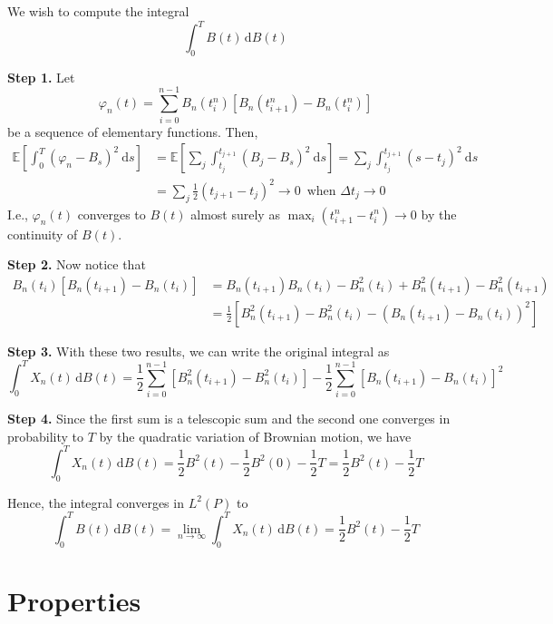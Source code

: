 \begin{example}
	We wish to compute the integral
	\[
		\int_0^T B(t) \, \mathrm{d}B(t)
	\]
	
	\textbf{Step 1.} Let
	\[
		\varphi_n(t) = \sum_{i=0}^{n-1} B_n(t_i^n)[B_n(t_{i+1}^n) - B_n(t_i^n)]
	\]
	be a sequence of elementary functions. Then,
	\begin{equation*}
		\begin{aligned}
			\mathbb{E} \left[ \int_0^T (\varphi_n - B_s)^2 ~\mathrm{d}s \right]
			&= \mathbb{E} \left[ \sum_j \int_{t_j}^{t_{j+1}} (B_j - B_s)^2 ~\mathrm{d}s \right]
			= \sum_j \int_{t_j}^{t_{j+1}} (s - t_j)^2 ~\mathrm{d}s \\
			&= \sum_j \frac{1}{2} \left(t_{j+1} - t_j \right)^2 \longrightarrow 0 \, \text{ when } \Delta t_j \to 0
		\end{aligned}
	\end{equation*}
	I.e., $\varphi_n(t)$ converges to $B(t)$ almost surely as $\max_i (t_{i+1}^n - t_i^n) \to 0$ by the continuity of $B(t)$.
	
	\textbf{Step 2.} Now notice that
	\begin{equation*}
		\begin{aligned}
			B_n(t_i)[B_n(t_{i+1}) - B_n(t_i)] &= B_n(t_{i+1}) B_n(t_i) - B_n^2(t_i) + B_n^2(t_{i+1}) - B_n^2(t_{i+1}) \\
			&= \frac{1}{2} [B_n^2(t_{i+1}) - B_n^2(t_i) - (B_n(t_{i+1}) - B_n(t_i))^2 ]
		\end{aligned}
	\end{equation*}
	
	\textbf{Step 3.} With these two results, we can write the original integral as
	\[
		\int_0^T X_n(t) \, \mathrm{d}B(t) = \frac{1}{2} \sum_{i=0}^{n-1} \left[ B_n^2(t_{i+1}) - B_n^2(t_i) \right] - \frac{1}{2} \sum_{i=0}^{n-1} \left[ B_n(t_{i+1}) - B_n(t_i) \right]^2
	\]
	
	\textbf{Step 4.} Since the first sum is a telescopic sum and the second one converges in probability to $T$ by the quadratic variation of Brownian motion, we have
	\[
		\int_0^T X_n(t) \, \mathrm{d}B(t) = \frac{1}{2} B^2(t) - \frac{1}{2} B^2(0) - \frac{1}{2}T = \frac{1}{2} B^2(t) - \frac{1}{2}T 
	\]
	
	Hence, the integral converges in $L^2(P)$ to
	\[
		\int_0^T B(t) \, \mathrm{d}B(t) = \lim_{n \to \infty} \int_0^T X_n(t) \, \mathrm{d}B(t) = \frac{1}{2} B^2(t) - \frac{1}{2}T 
	\]
\end{example}

\section{Properties} %

